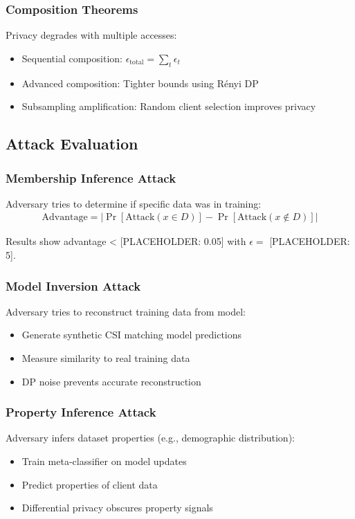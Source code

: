 \documentclass[journal]{IEEEtran}
\begin{document}
\subsubsection{Composition Theorems}
Privacy degrades with multiple accesses:
\begin{itemize}
\item Sequential composition: $\epsilon_{\text{total}} = \sum_t \epsilon_t$
\item Advanced composition: Tighter bounds using Rényi DP
\item Subsampling amplification: Random client selection improves privacy
\end{itemize}

\subsection{Attack Evaluation}

\subsubsection{Membership Inference Attack}
Adversary tries to determine if specific data was in training:
\begin{align}
\text{Advantage} = |\Pr[\text{Attack}(x \in D)] - \Pr[\text{Attack}(x \notin D)]|
\end{align}

Results show advantage < [PLACEHOLDER: 0.05] with $\epsilon = $ [PLACEHOLDER: 5].

\subsubsection{Model Inversion Attack}
Adversary tries to reconstruct training data from model:
\begin{itemize}
\item Generate synthetic CSI matching model predictions
\item Measure similarity to real training data
\item DP noise prevents accurate reconstruction
\end{itemize}

\subsubsection{Property Inference Attack}
Adversary infers dataset properties (e.g., demographic distribution):
\begin{itemize}
\item Train meta-classifier on model updates
\item Predict properties of client data
\item Differential privacy obscures property signals
\end{itemize}
\end{document}
